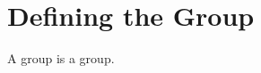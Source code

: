 \section{Defining the Group}

\begin{definition}
    \label{definition : Group}
    \leanok
    A group is a group.
\end{definition}